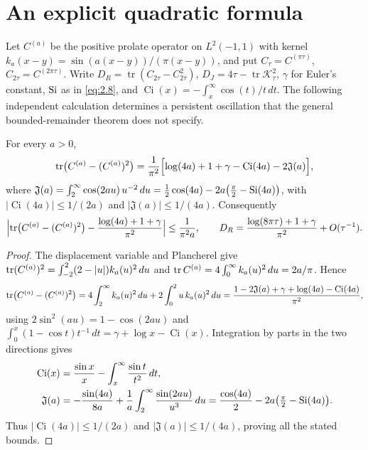 \section{An explicit quadratic formula}\label{sec:quadratic}
Let $C^{(a)}$ be the positive prolate operator on $L^2(-1,1)$ with
kernel\label{def:ka}
$k_a(x-y)=\sin(a(x-y))/(\pi(x-y))$, and put
$C_\tau=C^{(\pi\tau)}$, $C_{2\tau}=C^{(2\pi\tau)}$.
Write $D_R=\operatorname{tr}(C_{2\tau}-C_{2\tau}^2)$,
$D_J=4\tau-\operatorname{tr}\mathcal K_\tau^2$,
$\gamma$ for Euler's constant, $\operatorname{Si}$ as in \eqref{eq:2.8}, and
$\operatorname{Ci}(x)=-\int_x^\infty\cos(t)/t\,dt$.
The following independent calculation determines a persistent oscillation
that the general bounded-remainder theorem does not specify.
\begin{lemma}\label{lem:defect-exact}
For every $a>0$,
\begin{equation}\label{eq:defect-exact}
 \operatorname{tr}\bigl(C^{(a)}-(C^{(a)})^2\bigr)
 =\frac1{\pi^2}\Bigl[\log(4a)+1+\gamma-\operatorname{Ci}(4a)-2\mathfrak J(a)\Bigr],
\end{equation}
where $\mathfrak J(a)=\int_2^\infty\cos(2au)\,u^{-2}\,du
=\tfrac12\cos(4a)-2a\bigl(\tfrac\pi2-\operatorname{Si}(4a)\bigr)$, with $|\operatorname{Ci}(4a)|\le 1/(2a)$ and $|\mathfrak J(a)|\le 1/(4a)$.
Consequently
\begin{equation}\label{eq:defect-asymp}
 \Bigl|\operatorname{tr}\bigl(C^{(a)}-(C^{(a)})^2\bigr)
 -\frac{\log(4a)+1+\gamma}{\pi^2}\Bigr|\le\frac1{\pi^2a},
 \qquad
 D_R=\frac{\log(8\pi\tau)+1+\gamma}{\pi^2}+O(\tau^{-1}).
\end{equation}
\end{lemma}

\begin{proof}
The displacement variable and Plancherel give
$\operatorname{tr}(C^{(a)})^2=\int_{-2}^2(2-|u|)k_a(u)^2\,du$ and
$\operatorname{tr} C^{(a)}=4\int_0^\infty k_a(u)^2\,du=2a/\pi$. Hence
\[
 \operatorname{tr}\bigl(C^{(a)}-(C^{(a)})^2\bigr)
 =4\int_2^\infty k_a(u)^2\,du+2\int_0^2u\,k_a(u)^2\,du
 =\frac{1-2\mathfrak J(a)+\gamma+\log(4a)-\operatorname{Ci}(4a)}{\pi^2},
\]
using $2\sin^2(au)=1-\cos(2au)$ and
$\int_0^x(1-\cos t)t^{-1}\,dt=\gamma+\log x-\operatorname{Ci}(x)$.
Integration by parts in the two directions gives
\[
\begin{split}
 \operatorname{Ci}(x)&=\frac{\sin x}{x}-\int_x^\infty\frac{\sin t}{t^2}\,dt,\\
 \mathfrak J(a)&=-\frac{\sin(4a)}{8a}
       +\frac1a\int_2^\infty\frac{\sin(2au)}{u^3}\,du
 =\frac{\cos(4a)}2-2a\bigl(\tfrac\pi2-\operatorname{Si}(4a)\bigr).
\end{split}
\]
Thus $|\operatorname{Ci}(4a)|\le1/(2a)$ and
$|\mathfrak J(a)|\le1/(4a)$, proving all the stated bounds.
\end{proof}

